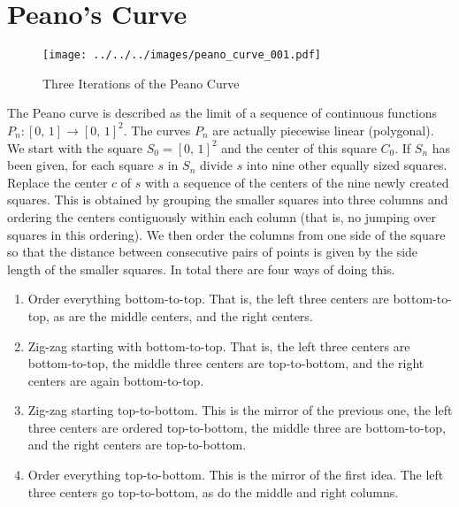 \documentclass{article}
\theoremstyle{plain}
\theoremstyle{normal}
\begin{document}
    \section{Peano's Curve}
        \begin{figure}
            \centering
            \texttt{[image: ../../../images/peano\_curve\_001.pdf]}
            \caption{Three Iterations of the Peano Curve}
            \label{fig:peano_curve_001}
        \end{figure}
        The Peano curve is described as the limit of a sequence of continuous
        functions $P_{n}:[0,\,1]\rightarrow[0,\,1]^{2}$. The curves
        $P_{n}$ are actually piecewise linear (polygonal). We start with the
        square $S_{0}=[0,\,1]^{2}$ and the center of this square $C_{0}$.
        If $S_{n}$ has been given, for each square $s$ in $S_{n}$ divide
        $s$ into nine other equally sized squares. Replace the center $c$ of $s$
        with a sequence of the centers of the nine newly created squares.
        This is obtained by grouping the smaller squares into three columns
        and ordering the centers contiguously within each column (that is,
        no jumping over squares in this ordering). We then
        order the columns from one side of the square so that the
        distance between consecutive pairs of points is given by the side
        length of the smaller squares. In total there are four ways of
        doing this.
        \begin{enumerate}
            \item Order everything bottom-to-top. That is, the left three
                centers are bottom-to-top, as are the middle centers, and the
                right centers.
            \item Zig-zag starting with bottom-to-top. That is, the left three
                centers are bottom-to-top, the middle three centers are
                top-to-bottom, and the right centers are again bottom-to-top.
            \item Zig-zag starting top-to-bottom. This is the mirror of the
                previous one, the left three centers are ordered top-to-bottom,
                the middle three are bottom-to-top, and the right centers are
                top-to-bottom.
            \item Order everything top-to-bottom. This is the mirror of the
                first idea. The left three centers go top-to-bottom, as do the
                middle and right columns.
        \end{enumerate}
\end{document}
